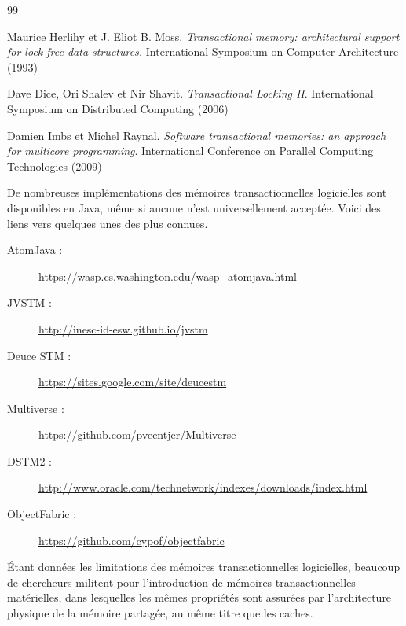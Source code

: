 \documentclass{td}
\begin{document}
\begin{thebibliography}{99}
  
  Maurice Herlihy et J. Eliot B. Moss. \emph{Transactional memory: architectural support for lock-free data structures.}
  International Symposium on Computer Architecture (1993)

  Dave Dice, Ori Shalev et Nir Shavit. \emph{Transactional Locking II}.
  International Symposium on Distributed Computing (2006)
  
  Damien Imbs et Michel Raynal. \emph{Software transactional memories: an approach for multicore programming}.
  International Conference on Parallel Computing Technologies (2009)

\end{thebibliography}

De nombreuses implémentations des mémoires transactionnelles logicielles sont disponibles en Java, même si aucune n'est universellement acceptée.
Voici des liens vers quelques unes des plus connues.

\begin{description}
\item [AtomJava :] \url{https://wasp.cs.washington.edu/wasp_atomjava.html}
\item [JVSTM :] \url{http://inesc-id-esw.github.io/jvstm}
\item [Deuce STM :] \url{https://sites.google.com/site/deucestm}
\item [Multiverse :] \url{https://github.com/pveentjer/Multiverse}
\item [DSTM2 :] \url{http://www.oracle.com/technetwork/indexes/downloads/index.html}
\item [ObjectFabric :] \url{https://github.com/cypof/objectfabric}
\end{description}

Étant données les limitations des mémoires transactionnelles logicielles, beaucoup de chercheurs militent pour l'introduction
de mémoires transactionnelles matérielles, dans lesquelles les mêmes propriétés sont assurées par l'architecture physique de
la mémoire partagée, au même titre que les caches.
\end{document}
